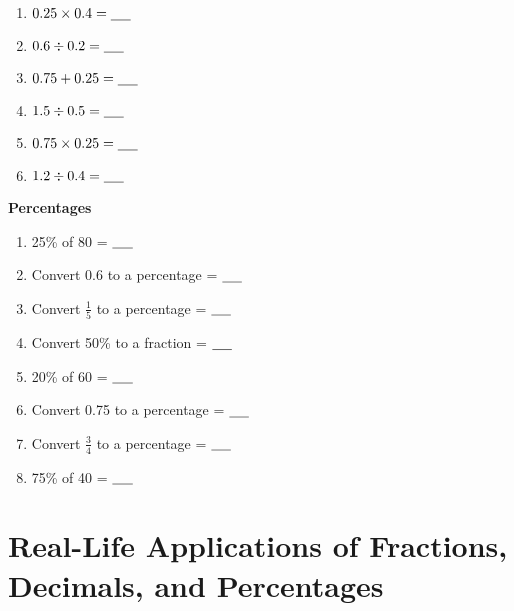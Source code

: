 \begin{multicols}{2}
\begin{enumerate}[label=(\alph*)]
        \item $0.25 \times 0.4 = \underline{\hspace{0.5cm}}$
        \item $0.6 \div 0.2 = \underline{\hspace{0.5cm}}$
        \item $0.75 + 0.25 = \underline{\hspace{0.5cm}}$
        \item $1.5 \div 0.5 = \underline{\hspace{0.5cm}}$
        \item $0.75 \times 0.25 = \underline{\hspace{0.5cm}}$
        \item $1.2 \div 0.4 = \underline{\hspace{0.5cm}}$
    \end{enumerate}
\end{multicols}
\begin{center}
    \textbf{Percentages}
    \begin{enumerate}[label=(\alph*)]
        \item 25\% of 80 = $\underline{\hspace{0.5cm}}$
        \item Convert 0.6 to a percentage = $\underline{\hspace{0.5cm}}$
        \item Convert $\frac{1}{5}$ to a percentage = $\underline{\hspace{0.5cm}}$
        \item Convert 50\% to a fraction = $\underline{\hspace{0.5cm}}$
        \item 20\% of 60 = $\underline{\hspace{0.5cm}}$
        \item Convert 0.75 to a percentage = $\underline{\hspace{0.5cm}}$
        \item Convert $\frac{3}{4}$ to a percentage = $\underline{\hspace{0.5cm}}$
        \item 75\% of 40 = $\underline{\hspace{0.5cm}}$
    \end{enumerate}
\end{center}

\section{Real-Life Applications of Fractions, Decimals, and Percentages}
